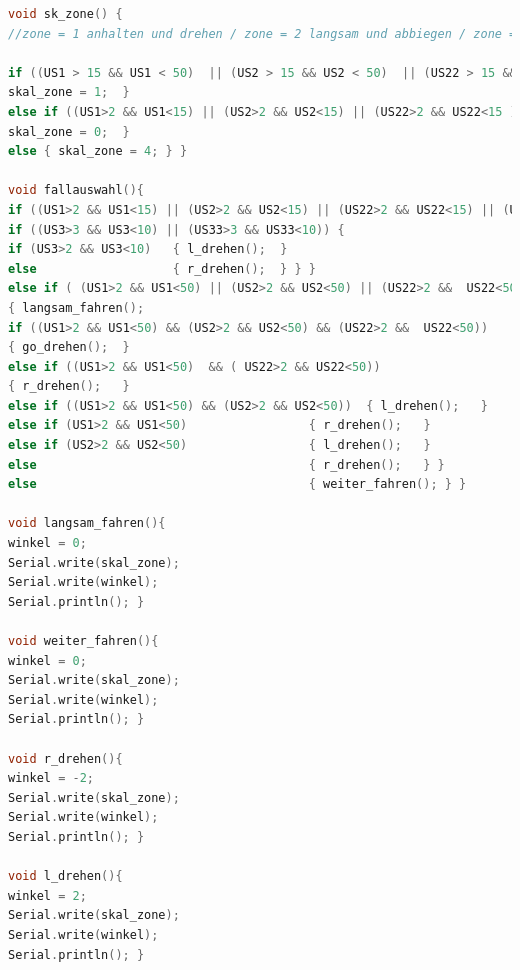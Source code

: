 \begin{lstlisting}[language=C++, caption=Code zur Hinderniserkennung und Hindernif umfahren, label={lst:deadReackon}]
void sk_zone() {  
//zone = 1 anhalten und drehen / zone = 2 langsam und abbiegen / zone = 3 norm. fahren

if ((US1 > 15 && US1 < 50)  || (US2 > 15 && US2 < 50)  || (US22 > 15 && US22 < 50) || (US3 > 10 && US3 < 30) || (US33 > 10 && US33 < 30)){
skal_zone = 1;  }
else if ((US1>2 && US1<15) || (US2>2 && US2<15) || (US22>2 && US22<15 ) || (US3>2 && US3<10) || (US33>2 && US33<10)){
skal_zone = 0;  }
else { skal_zone = 4; } }

void fallauswahl(){ 
if ((US1>2 && US1<15) || (US2>2 && US2<15) || (US22>2 && US22<15) || (US3>3 && US3<10) || (US33>3 && US33<10)) { langsam_fahren();
if ((US3>3 && US3<10) || (US33>3 && US33<10)) {
if (US3>2 && US3<10)   { l_drehen();  } 
else                   { r_drehen();  } } }
else if ( (US1>2 && US1<50) || (US2>2 && US2<50) || (US22>2 &&  US22<50)) 
{ langsam_fahren(); 
if ((US1>2 && US1<50) && (US2>2 && US2<50) && (US22>2 &&  US22<50)) 
{ go_drehen();  }
else if ((US1>2 && US1<50)  && ( US22>2 && US22<50))
{ r_drehen();   }
else if ((US1>2 && US1<50) && (US2>2 && US2<50))  { l_drehen();   }
else if (US1>2 && US1<50)                 { r_drehen();   }
else if (US2>2 && US2<50)                 { l_drehen();   }
else                                      { r_drehen();   } }
else                                      { weiter_fahren(); } }

void langsam_fahren(){   
winkel = 0;
Serial.write(skal_zone);
Serial.write(winkel);
Serial.println(); }

void weiter_fahren(){   
winkel = 0;
Serial.write(skal_zone);
Serial.write(winkel);
Serial.println(); }

void r_drehen(){ 
winkel = -2;
Serial.write(skal_zone);
Serial.write(winkel);
Serial.println(); }

void l_drehen(){ 
winkel = 2;
Serial.write(skal_zone);
Serial.write(winkel);
Serial.println(); }

\end{lstlisting}

\pagebreak